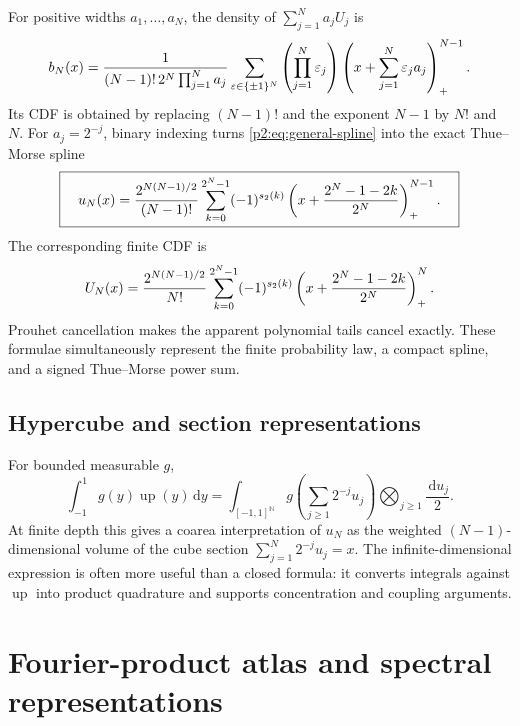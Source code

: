\documentclass[11pt]{article}
\theoremstyle{definition}
\theoremstyle{remark}
\newcommand{\N}{\mathbb N}
\newcommand{\dd}{\,\mathrm d}
\newcommand{\Up}{\operatorname{up}}
\begin{document}
For positive widths $a_1,\dots,a_N$, the density of
$\sum_{j=1}^Na_jU_j$ is
\begin{equation}
 b_N(x)=\frac{1}{(N-1)!\,2^N\prod_{j=1}^Na_j}
 \sum_{\varepsilon\in\{\pm1\}^N}
 \left(\prod_{j=1}^N\varepsilon_j\right)
 \left(x+\sum_{j=1}^N\varepsilon_ja_j\right)_{+}^{N-1}.        \label{p2:eq:general-spline}
\end{equation}
Its CDF is obtained by replacing $(N-1)!$ and the exponent $N-1$ by $N!$ and $N$.
For $a_j=2^{-j}$, binary indexing turns \eqref{p2:eq:general-spline} into the exact
Thue--Morse spline
\begin{equation}
 \boxed{\quad
 u_N(x)=\frac{2^{N(N-1)/2}}{(N-1)!}
 \sum_{k=0}^{2^N-1}(-1)^{s_2(k)}
 \left(x+\frac{2^N-1-2k}{2^N}\right)_{+}^{N-1}.
 \quad}                                                  \label{p2:eq:TM-spline}
\end{equation}
The corresponding finite CDF is
\begin{equation}
 U_N(x)=\frac{2^{N(N-1)/2}}{N!}
 \sum_{k=0}^{2^N-1}(-1)^{s_2(k)}
 \left(x+\frac{2^N-1-2k}{2^N}\right)_{+}^{N}.                  \label{p2:eq:TM-spline-cdf}
\end{equation}
Prouhet cancellation makes the apparent polynomial tails cancel exactly.  These formulae
simultaneously represent the finite probability law, a compact spline, and a signed
Thue--Morse power sum.

\subsection{Hypercube and section representations}

For bounded measurable $g$,
\begin{equation}
 \int_{-1}^{1}g(y)\Up(y)\dd y
 =\int_{[-1,1]^{\N}}g\left(\sum_{j\ge1}2^{-j}u_j\right)
   \bigotimes_{j\ge1}\frac{\dd u_j}{2}.                 \label{p2:eq:infinite-cube}
\end{equation}
At finite depth this gives a coarea interpretation of $u_N$ as the weighted $(N-1)$-
dimensional volume of the cube section
\(
 \sum_{j=1}^N2^{-j}u_j=x.
\)
The infinite-dimensional expression is often more useful than a closed formula: it converts
integrals against $\Up$ into product quadrature and supports concentration and coupling
arguments.

\section{Fourier-product atlas and spectral representations}
\label{p2:sec:fourier-atlas}
\end{document}
